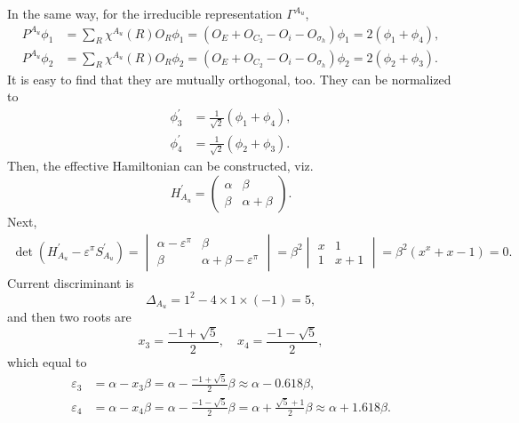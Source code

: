 \documentclass[a4paper]{book}
\newcommand{\Hp}{H^\prime}
\newcommand{\Sp}{S^\prime}
\begin{document}
\begin{solution}
\begin{enumerate}[label=(\alph*)]
		In the same way, for the irreducible representation $\Gamma^{A_u}$,
		\begin{align*}
		P^{A_u}\phi_1 &= \sum_{R} \chi^{A_u}(R) O_R \phi_1 = (O_E + O_{C_2} - O_{i} - O_{\sigma_h})\phi_1 = 2(\phi_1+\phi_4) , \\
		P^{A_u}\phi_2 &= \sum_{R} \chi^{A_u}(R) O_R \phi_2 = (O_E + O_{C_2} - O_{i} - O_{\sigma_h})\phi_2 = 2(\phi_2+\phi_3) .
		\end{align*}
		It is easy to find that they are mutually orthogonal, too. They can be normalized to
		\begin{align*}
		\phi^\prime_3 &= \frac{1}{\sqrt{2}} (\phi_1+\phi_4) , \\
		\phi^\prime_4 &= \frac{1}{\sqrt{2}} (\phi_2+\phi_3) .
		\end{align*}
		Then, the effective Hamiltonian can be constructed, viz.
		\begin{equation*}
			\Hp_{A_u} = \begin{pmatrix}
				\alpha	&	\beta \\ \beta & \alpha + \beta 
			\end{pmatrix}.
		\end{equation*}
		Next,
		\begin{align*}
			\det(\Hp_{A_u}-\varepsilon^\pi \Sp_{A_u}) = \begin{vmatrix}	
			\alpha-\varepsilon^\pi	&	\beta \\ 
			\beta & \alpha + \beta -\varepsilon^\pi	
\end{vmatrix} = \beta^2
\begin{vmatrix}
			x & 1 \\ 1 & x +1			
			\end{vmatrix} = \beta^2 ( x^x + x - 1 ) = 0.
		\end{align*}
		Current discriminant is
		\begin{equation*}
			\Delta_{A_u} = 1^2 - 4 \times 1 \times (-1) = 5,
		\end{equation*}		
		and then two roots are
		\begin{equation*}
			x_3 = \frac{-1+\sqrt{5}}{2}, \quad x_4 = \frac{-1-\sqrt{5}}{2},
		\end{equation*}
		which equal to
		\begin{align}
			\varepsilon_3 &= \alpha - x_3 \beta = \alpha - \frac{-1+\sqrt{5}}{2} \beta \approx \alpha - 0.618 \beta , \\
			\varepsilon_4 &= \alpha - x_4 \beta = \alpha - \frac{-1-\sqrt{5}}{2} \beta = \alpha + \frac{\sqrt{5}+1}{2} \beta \approx \alpha + 1.618 \beta .
		\end{align}
		

\end{enumerate}
\end{solution}
\end{document}
